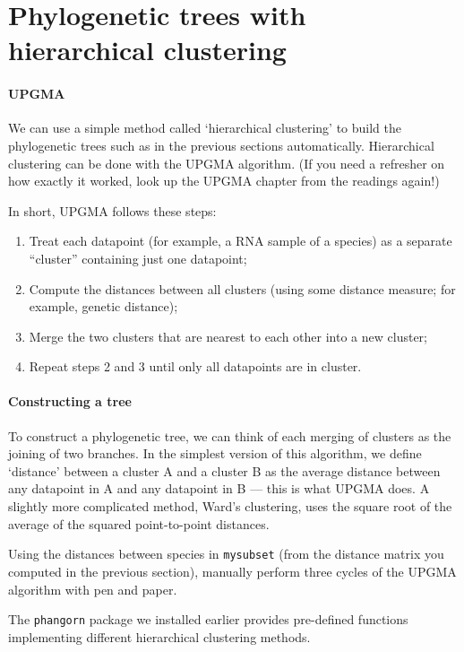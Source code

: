 \documentclass[a4paper, 9pt]{article}
\begin{document}
\section{Phylogenetic trees with hierarchical clustering}
\paragraph{UPGMA} We can use a simple method called `hierarchical clustering' to build the phylogenetic trees such as in the previous sections automatically. Hierarchical clustering can be done with the UPGMA algorithm. (If you need a refresher on how exactly it worked, look up the UPGMA chapter from the readings again!)

In short, UPGMA follows these steps:

\begin{enumerate}
\item Treat each datapoint (for example, a RNA sample of a species) as a separate ``cluster'' containing just one datapoint;
\item Compute the distances between all clusters (using some distance measure; for example, genetic distance);
\item Merge the two clusters that are nearest to each other into a new cluster;
\item Repeat steps 2 and 3 until only all datapoints are in cluster. 
\end{enumerate}

\paragraph{Constructing a tree} To construct a phylogenetic tree, we can think of each merging of
clusters as the joining of two branches. In the simplest version of this
algorithm, we define `distance' between a cluster A and a cluster B as
the average distance between any datapoint in A and any datapoint in B --- this is what UPGMA does. A slightly more complicated method, Ward's clustering, uses the square root of the average of the squared point-to-point distances.

\begin{exercise}
    \askstar Using the distances between species in \texttt{mysubset} (from the distance matrix you computed in the previous section), manually perform three cycles of the UPGMA algorithm with pen and paper.
\end{exercise}

The \texttt{phangorn} package we installed earlier provides pre-defined
functions implementing different hierarchical clustering methods.
\end{document}
